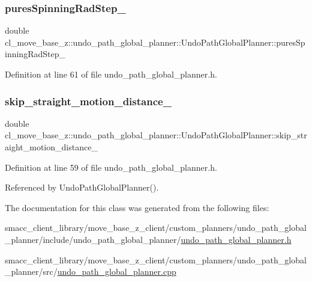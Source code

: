 \subsubsection{\texorpdfstring{pures\+Spinning\+Rad\+Step\+\_\+}{puresSpinningRadStep\_}}
{\footnotesize\ttfamily double cl\+\_\+move\+\_\+base\+\_\+z\+::undo\+\_\+path\+\_\+global\+\_\+planner\+::\+Undo\+Path\+Global\+Planner\+::pures\+Spinning\+Rad\+Step\+\_\+\hspace{0.3cm}{\ttfamily [private]}}



Definition at line 61 of file undo\+\_\+path\+\_\+global\+\_\+planner.\+h.

\mbox{\label{classcl__move__base__z_1_1undo__path__global__planner_1_1UndoPathGlobalPlanner_a9cb4fb49c952deeb77eb1cb9648d122f}} 
\subsubsection{\texorpdfstring{skip\+\_\+straight\+\_\+motion\+\_\+distance\+\_\+}{skip\_straight\_motion\_distance\_}}
{\footnotesize\ttfamily double cl\+\_\+move\+\_\+base\+\_\+z\+::undo\+\_\+path\+\_\+global\+\_\+planner\+::\+Undo\+Path\+Global\+Planner\+::skip\+\_\+straight\+\_\+motion\+\_\+distance\+\_\+\hspace{0.3cm}{\ttfamily [private]}}



Definition at line 59 of file undo\+\_\+path\+\_\+global\+\_\+planner.\+h.



Referenced by Undo\+Path\+Global\+Planner().



The documentation for this class was generated from the following files\+:\begin{DoxyCompactItemize}
\item 
smacc\+\_\+client\+\_\+library/move\+\_\+base\+\_\+z\+\_\+client/custom\+\_\+planners/undo\+\_\+path\+\_\+global\+\_\+planner/include/undo\+\_\+path\+\_\+global\+\_\+planner/\hyperlink{undo__path__global__planner_8h}{undo\+\_\+path\+\_\+global\+\_\+planner.\+h}\item 
smacc\+\_\+client\+\_\+library/move\+\_\+base\+\_\+z\+\_\+client/custom\+\_\+planners/undo\+\_\+path\+\_\+global\+\_\+planner/src/\hyperlink{undo__path__global__planner_8cpp}{undo\+\_\+path\+\_\+global\+\_\+planner.\+cpp}\end{DoxyCompactItemize}
